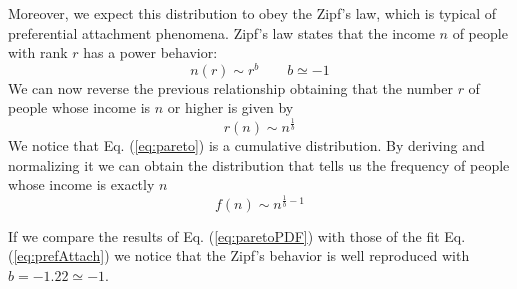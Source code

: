 Moreover, we expect this distribution to obey the Zipf's law, which is typical of preferential attachment phenomena.
Zipf's law states that the income $n$ of people with rank $r$ has a power behavior:
\begin{equation}
    n(r) \sim r^b \ \ \ \ \ \ \ \ \ b \simeq -1
    \label{eq:zipf}
\end{equation}
We can now reverse the previous relationship \cite{zipf} obtaining that the number $r$ of people whose income is $n$ or higher is given by
\begin{equation}
    r(n) \sim n^{\frac{1}{b}}
    \label{eq:pareto}
\end{equation}
We notice that Eq. (\ref{eq:pareto}) is a cumulative distribution.
By deriving and normalizing it we can obtain the distribution that tells us the frequency of people whose income is exactly $n$
\begin{equation}
    f(n) \sim n^{\frac{1}{b} - 1}
    \label{eq:paretoPDF}
\end{equation}

If we compare the results of Eq. (\ref{eq:paretoPDF}) with those of the fit Eq. (\ref{eq:prefAttach}) we notice that the Zipf's behavior is well reproduced with $b = -1.22 \simeq -1$.
